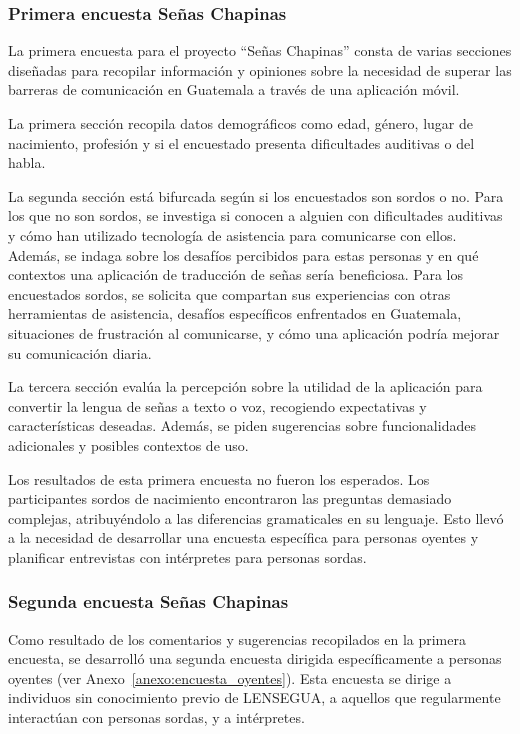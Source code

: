 \subsubsection{Primera encuesta Señas Chapinas}

La primera encuesta para el proyecto ``Señas Chapinas'' consta de varias secciones diseñadas para recopilar información y opiniones sobre la necesidad de superar las barreras de comunicación en Guatemala a través de una aplicación móvil.

La primera sección recopila datos demográficos como edad, género, lugar de nacimiento, profesión y si el encuestado presenta dificultades auditivas o del habla.

La segunda sección está bifurcada según si los encuestados son sordos o no. Para los que no son sordos, se investiga si conocen a alguien con dificultades auditivas y cómo han utilizado tecnología de asistencia para comunicarse con ellos. Además, se indaga sobre los desafíos percibidos para estas personas y en qué contextos una aplicación de traducción de señas sería beneficiosa. Para los encuestados sordos, se solicita que compartan sus experiencias con otras herramientas de asistencia, desafíos específicos enfrentados en Guatemala, situaciones de frustración al comunicarse, y cómo una aplicación podría mejorar su comunicación diaria.

La tercera sección evalúa la percepción sobre la utilidad de la aplicación para convertir la lengua de señas a texto o voz, recogiendo expectativas y características deseadas. Además, se piden sugerencias sobre funcionalidades adicionales y posibles contextos de uso.

Los resultados de esta primera encuesta no fueron los esperados. Los participantes sordos de nacimiento encontraron las preguntas demasiado complejas, atribuyéndolo a las diferencias gramaticales en su lenguaje. Esto llevó a la necesidad de desarrollar una encuesta específica para personas oyentes y planificar entrevistas con intérpretes para personas sordas.


\subsubsection{Segunda encuesta Señas Chapinas}

Como resultado de los comentarios y sugerencias recopilados en la primera encuesta, se desarrolló una segunda encuesta dirigida específicamente a personas oyentes (ver Anexo~\ref{anexo:encuesta_oyentes}). Esta encuesta se dirige a individuos sin conocimiento previo de LENSEGUA, a aquellos que regularmente interactúan con personas sordas, y a intérpretes. 

